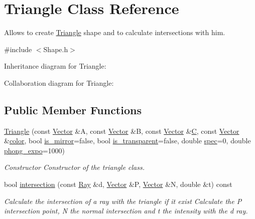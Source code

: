 \hypertarget{classTriangle}{}\section{Triangle Class Reference}
\label{classTriangle}


Allows to create \hyperlink{classTriangle}{Triangle} shape and to calculate intersections with him.  




{\ttfamily \#include $<$Shape.\+h$>$}



Inheritance diagram for Triangle\+:


Collaboration diagram for Triangle\+:
\subsection*{Public Member Functions}
\begin{DoxyCompactItemize}
\item 
\hyperlink{classTriangle_a7646770e1ed718e4a88521d15113446c}{Triangle} (const \hyperlink{classVector}{Vector} \&A, const \hyperlink{classVector}{Vector} \&B, const \hyperlink{classVector}{Vector} \&\hyperlink{classTriangle_af4a3aa7354bf229be9d4149dc800b5ee}{C}, const \hyperlink{classVector}{Vector} \&\hyperlink{classShape_adb97857c268315aed7861e5204c2485b}{color}, bool \hyperlink{classShape_a0ead7657fa5e4c7862fe1cedd670a9e5}{is\+\_\+mirror}=false, bool \hyperlink{classShape_ab8da3fc4606e66dea941ec23d25f53ef}{is\+\_\+transparent}=false, double \hyperlink{classShape_a60ef96ac5dea3478fdd1ab320e4c3bef}{spec}=0, double \hyperlink{classShape_a2556fca106f9503e6dfb4da703c28f7f}{phong\+\_\+expo}=1000)
\begin{DoxyCompactList}\small\item\em Constructor Constructor of the triangle class. \end{DoxyCompactList}\item 
bool \hyperlink{classTriangle_a3290db0f1a807905ff0293b209e32dbf}{intersection} (const \hyperlink{classRay}{Ray} \&d, \hyperlink{classVector}{Vector} \&P, \hyperlink{classVector}{Vector} \&N, double \&t) const
\begin{DoxyCompactList}\small\item\em Calculate the intersection of a ray with the triangle if it exist Calculate the P intersection point, N the normal intersection and t the intensity with the d ray. \end{DoxyCompactList}\end{DoxyCompactItemize}
